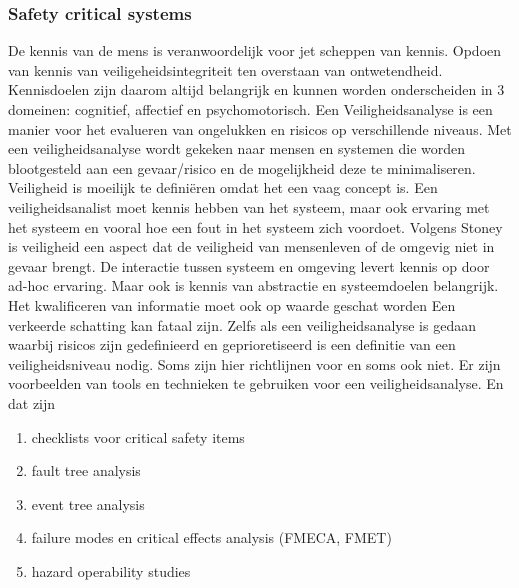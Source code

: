 \documentclass{article}
\begin{document}
	\subsubsection{Safety critical systems}
	
	De kennis van de mens is veranwoordelijk voor jet scheppen van kennis. Opdoen van kennis van veiligeheidsintegriteit ten overstaan van ontwetendheid. Kennisdoelen zijn daarom altijd belangrijk en kunnen worden onderscheiden in 3 domeinen: cognitief, affectief en psychomotorisch.\cite{winceckCriticalToSafety}
	Een Veiligheidsanalyse is een manier voor het evalueren  van ongelukken en risicos op verschillende niveaus. Met een veiligheidsanalyse wordt gekeken naar mensen en systemen die worden blootgesteld aan een gevaar/risico en de mogelijkheid deze te minimaliseren.
	Veiligheid is moeilijk te definiëren omdat het een vaag concept is.
	Een veiligheidsanalist  moet kennis hebben van het systeem, maar ook ervaring met het systeem en vooral hoe een fout in het systeem zich voordoet.
	Volgens Stoney\cite{chambersHazardAnalysisSCS} is veiligheid een aspect dat de veiligheid van mensenleven  of de omgevig niet in gevaar brengt.
	De interactie tussen systeem en omgeving levert kennis op door ad-hoc ervaring. Maar ook is kennis van abstractie en systeemdoelen belangrijk.
	Het kwalificeren van informatie moet ook op waarde geschat worden Een verkeerde schatting kan fataal zijn. Zelfs als een veiligheidsanalyse  is gedaan waarbij risicos zijn gedefinieerd en geprioretiseerd is een definitie van een veiligheidsniveau nodig. Soms zijn hier richtlijnen voor en soms ook niet.
	Er zijn voorbeelden van tools en technieken te gebruiken voor een veiligheidsanalyse. En dat zijn 
	\begin{enumerate}
		\item   checklists voor critical safety items
		\item  fault tree analysis
		\item  event tree analysis
		\item failure modes en critical effects analysis (FMECA, FMET)
		\item hazard operability studies
	\end{enumerate}
	
\end{document}
